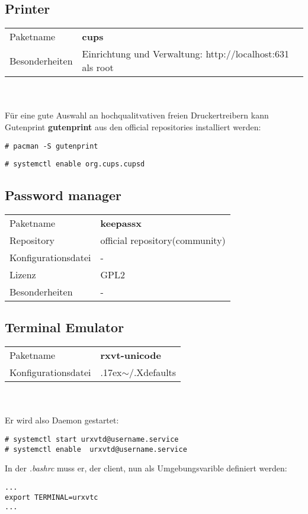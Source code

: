 \subsection{Printer}
\begin{tabular}{l|l}
Paketname & \textbf{cups} \\ 
Besonderheiten & Einrichtung und Verwaltung: http://localhost:631 als root \\
\end{tabular}
\\ \\
Für eine gute Auswahl an hochqualitvativen freien Druckertreibern kann Gutenprint \textbf{gutenprint}
aus den official repositories installiert werden:
\begin{lstlisting}[style=Bash]
# pacman -S gutenprint 
\end{lstlisting}
\begin{lstlisting}[style=Bash]
# systemctl enable org.cups.cupsd 
\end{lstlisting}

\subsection{Password manager}
\begin{tabular}{l|l}
Paketname & \textbf{keepassx} \\ 
Repository & official repository(community) \\
Konfigurationsdatei & - \\
Lizenz & GPL2 \\
Besonderheiten & - \\
\end{tabular}

\subsection{Terminal Emulator}
\begin{tabular}{l|l}
Paketname & \textbf{rxvt-unicode} \\ 
Konfigurationsdatei & {{\raise.17ex\hbox{$\scriptstyle\mathtt{\sim}$}}/.Xdefaults} \\
\end{tabular}
\\ \\
Er wird also Daemon gestartet: 
\begin{lstlisting}[style=Bash]
# systemctl start urxvtd@username.service
# systemctl enable  urxvtd@username.service
\end{lstlisting}
In der \emph{.bashrc} muss er, der client, nun als Umgebungsvarible definiert werden:
\begin{lstlisting}[style=Bash]
...
export TERMINAL=urxvtc
...
\end{lstlisting}

